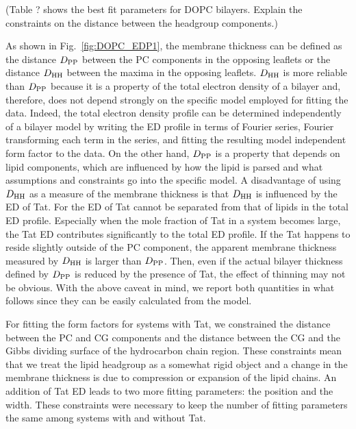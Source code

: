 (Table ? shows the best fit parameters for DOPC bilayers. Explain the 
constraints on the distance between the headgroup components.)

As shown in Fig.~\ref{fig:DOPC_EDP1}, the membrane thickness can be defined
as the distance $D_\textrm{PP}$ between the PC components in the opposing leaflets
or the distance $D_\textrm{HH}$ between the maxima in the opposing leaflets. $D_\textrm{HH}$
is more reliable than $D_\textrm{PP}$ because it is a property of the total 
electron density of a bilayer and, therefore, does not depend strongly on the 
specific model employed for fitting the data. Indeed, the total electron
density profile can be determined independently of a bilayer model 
by writing the ED profile in terms of Fourier series, Fourier transforming
each term in the series, and fitting the resulting model independent
form factor to the data. On the other hand, $D_\textrm{PP}$ is a property that
depends on lipid components, which are influenced by how the lipid is parsed 
and what assumptions and constraints go into the specific model.
A disadvantage of using $D_\textrm{HH}$ as a measure of the membrane thickness is
that $D_\textrm{HH}$ is influenced by the ED of Tat. For the ED of Tat cannot be 
separated from that of lipids in the total ED profile. Especially 
when the mole fraction of Tat in a system becomes large, the Tat ED contributes significantly to the total ED profile. If the Tat happens to reside slightly 
outside of the PC component, the apparent membrane thickness measured by $D_\textrm{HH}$
is larger than $D_\textrm{PP}$. Then, even if the actual bilayer thickness defined by $D_\textrm{PP}$ 
is reduced by the presence of Tat, the effect of thinning may not be obvious. 
With the above caveat in mind, we report both quantities in what follows
since they can be easily calculated from the model.

For fitting the form factors for systems with Tat, we constrained the 
distance between the PC and CG components and the distance between the
CG and the Gibbs dividing surface of the hydrocarbon chain region.
These constraints mean that we treat the lipid headgroup as a somewhat
rigid object and a change in the membrane thickness is due to compression
or expansion of the lipid chains. An addition of Tat ED leads to
two more fitting parameters: the position and the width. 
These constraints were necessary to keep the number of fitting parameters 
the same among systems with and without Tat.
 
